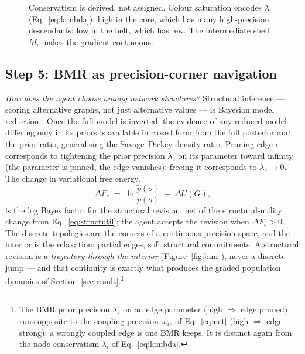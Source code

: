 \begin{figure}[t]
\caption{Conservatism is derived, not assigned. Colour saturation
encodes $\lambda_i$ (Eq.~\ref{eq:lambda}): high in the core, which has
many high-precision descendants; low in the belt, which has few. The
intermediate shell $M_i$ makes the gradient continuous.}
\label{fig:conservatism}
\end{figure}

\subsection{Step 5: BMR as precision-corner navigation}
\label{ssec:bmr}

\noindent\textit{How does the agent choose among network structures?}
Structural inference --- scoring alternative graphs, not just alternative
values --- is Bayesian model reduction \citep{Friston2018_2,
fristonPenny2011PostHocBMS}.%
Once the full model is inverted, the evidence of any reduced model
differing only in its priors is available in closed form from the full
posterior and the prior ratio, generalising the Savage--Dickey density
ratio. Pruning edge $e$ corresponds to tightening the prior precision
$\lambda_e$ on its parameter toward infinity (the parameter is pinned,
the edge vanishes); freeing it corresponds to $\lambda_e \to 0$. The
change in variational free energy,
\begin{equation}
\Delta F_e \;=\; \ln \frac{\tilde p(o)}{p(o)}
\;-\; \Delta U(G),
\label{eq:bmr}
\end{equation}
is the log Bayes factor for the structural revision, net of the
structural-utility change from Eq.~\eqref{eq:structutil}; the agent
accepts the revision when $\Delta F_e > 0$. The discrete topologies are
the corners of a continuous precision space, and the interior is the
relaxation: partial edges, soft structural commitments. A structural
revision is a \emph{trajectory through the interior}
(Figure~\ref{fig:bmr}), never a discrete jump --- and that continuity is
exactly what produces the graded population dynamics of
Section~\ref{sec:result}.\footnote{The BMR prior precision $\lambda_e$
on an edge parameter (high $\Rightarrow$ edge pruned) runs opposite to
the coupling precision $\pi_{uv}$ of Eq.~\eqref{eq:net} (high
$\Rightarrow$ edge strong); a strongly coupled edge is one BMR keeps. It
is distinct again from the node conservatism $\lambda_i$ of
Eq.~\eqref{eq:lambda}.}

